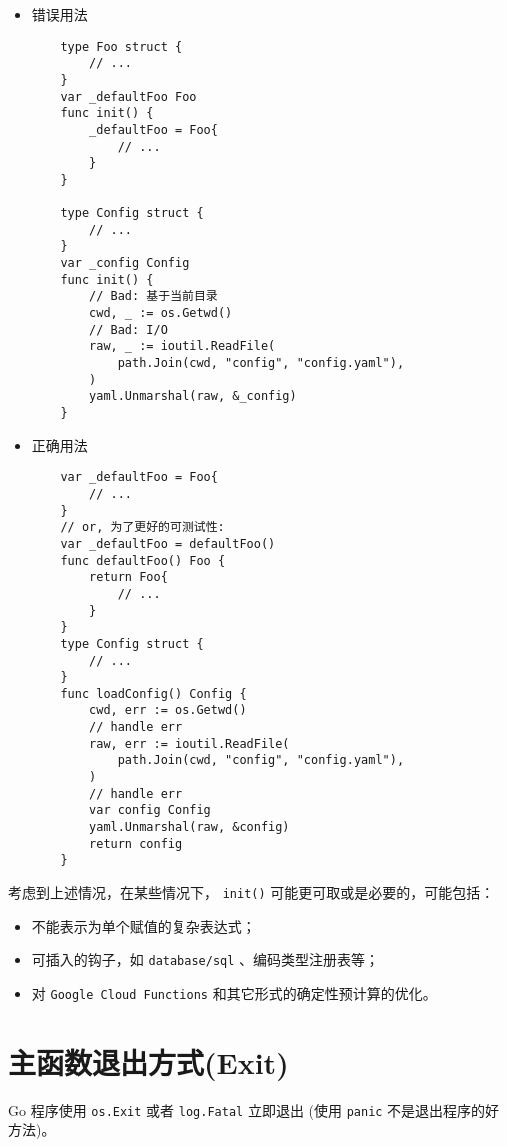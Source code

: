 \begin{itemize}[leftmargin=4em]
\item 错误用法

  \begin{verbatim}
    type Foo struct {
    	// ...
    }
    var _defaultFoo Foo
    func init() {
    	_defaultFoo = Foo{
    		// ...
    	}
    }

    type Config struct {
    	// ...
    }
    var _config Config
    func init() {
    	// Bad: 基于当前目录
    	cwd, _ := os.Getwd()
    	// Bad: I/O
    	raw, _ := ioutil.ReadFile(
    		path.Join(cwd, "config", "config.yaml"),
    	)
    	yaml.Unmarshal(raw, &_config)
    }
  \end{verbatim}
\item 正确用法

  \begin{verbatim}
    var _defaultFoo = Foo{
    	// ...
    }
    // or, 为了更好的可测试性:
    var _defaultFoo = defaultFoo()
    func defaultFoo() Foo {
    	return Foo{
    		// ...
    	}
    }
    type Config struct {
    	// ...
    }
    func loadConfig() Config {
    	cwd, err := os.Getwd()
    	// handle err
    	raw, err := ioutil.ReadFile(
    		path.Join(cwd, "config", "config.yaml"),
    	)
    	// handle err
    	var config Config
    	yaml.Unmarshal(raw, &config)
    	return config
    }
  \end{verbatim}
\end{itemize}

考虑到上述情况，在某些情况下， \texttt{init()} 可能更可取或是必要的，可能包括：
\begin{itemize}[leftmargin=4em]
\item 不能表示为单个赋值的复杂表达式；
\item 可插入的钩子，如 \texttt{database/sql} 、编码类型注册表等；
\item 对 \texttt{Google Cloud Functions} 和其它形式的确定性预计算的优化。
\end{itemize}

\section{主函数退出方式(Exit)}
Go 程序使用 \texttt{os.Exit} 或者 \texttt{log.Fatal\*} 立即退出 (使用 \texttt{panic} 不是退出程序的好方法)。

